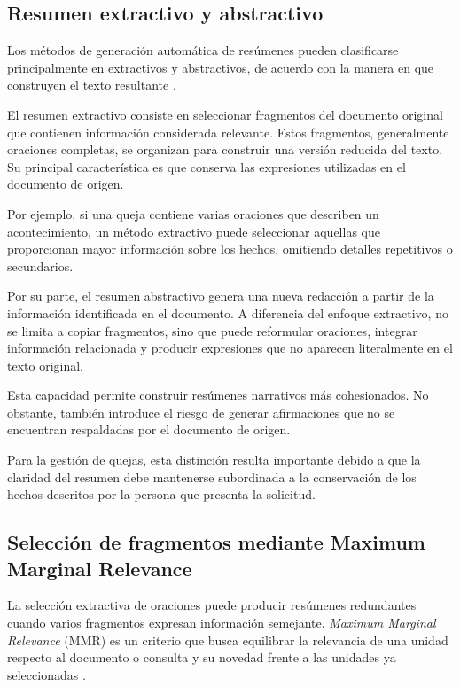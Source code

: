 \subsection{Resumen extractivo y abstractivo}

Los métodos de generación automática de resúmenes pueden clasificarse principalmente en extractivos y abstractivos, de acuerdo con la manera en que construyen el texto resultante \cite{jurafsky2023slp}.

El resumen extractivo consiste en seleccionar fragmentos del documento original que contienen información considerada relevante. Estos fragmentos, generalmente oraciones completas, se organizan para construir una versión reducida del texto. Su principal característica es que conserva las expresiones utilizadas en el documento de origen.

Por ejemplo, si una queja contiene varias oraciones que describen un acontecimiento, un método extractivo puede seleccionar aquellas que proporcionan mayor información sobre los hechos, omitiendo detalles repetitivos o secundarios.

Por su parte, el resumen abstractivo genera una nueva redacción a partir de la información identificada en el documento. A diferencia del enfoque extractivo, no se limita a copiar fragmentos, sino que puede reformular oraciones, integrar información relacionada y producir expresiones que no aparecen literalmente en el texto original.

Esta capacidad permite construir resúmenes narrativos más cohesionados. No obstante, también introduce el riesgo de generar afirmaciones que no se encuentran respaldadas por el documento de origen.

Para la gestión de quejas, esta distinción resulta importante debido a que la claridad del resumen debe mantenerse subordinada a la conservación de los hechos descritos por la persona que presenta la solicitud.

\subsection{Selección de fragmentos mediante Maximum Marginal Relevance}

La selección extractiva de oraciones puede producir resúmenes redundantes cuando varios fragmentos expresan información semejante. \textit{Maximum Marginal Relevance} (MMR) es un criterio que busca equilibrar la relevancia de una unidad respecto al documento o consulta y su novedad frente a las unidades ya seleccionadas \cite{carbonell1998mmr}.

